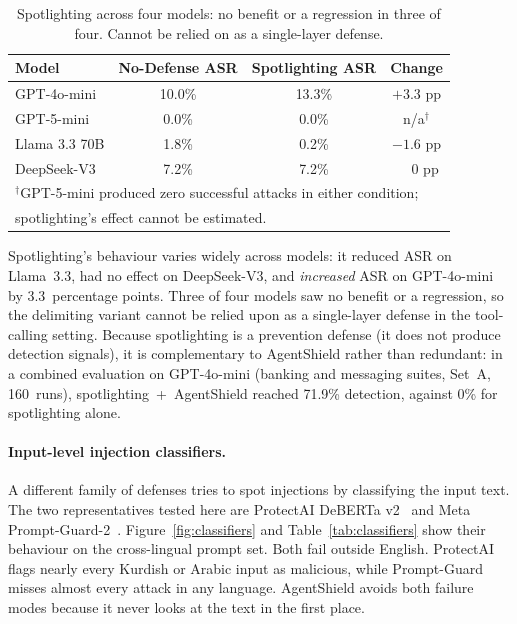 \documentclass[preprint,12pt]{elsarticle}
\begin{document}
\begin{table}[H]
\centering
\caption{Spotlighting across four models: no benefit or a regression in three of four. Cannot be relied on as a single-layer defense.}
\label{tab:spotlight}
\begin{tabular}{lccc}
\toprule
\textbf{Model} & \textbf{No-Defense ASR} & \textbf{Spotlighting ASR} & \textbf{Change} \\
\midrule
GPT-4o-mini   & 10.0\% & 13.3\% & $+3.3$ pp \\
GPT-5-mini    & 0.0\%  & 0.0\%  & n/a$^\dagger$ \\
Llama 3.3 70B & 1.8\%  & 0.2\%  & $-1.6$ pp \\
DeepSeek-V3   & 7.2\%  & 7.2\%  & $\phantom{+}0$ pp \\
\bottomrule
\multicolumn{4}{l}{\footnotesize $^\dagger$GPT-5-mini produced zero successful attacks in either condition;} \\
\multicolumn{4}{l}{\footnotesize spotlighting's effect cannot be estimated.} \\
\end{tabular}
\end{table}

Spotlighting's behaviour varies widely across models: it reduced ASR on Llama~3.3, had no effect on DeepSeek-V3, and \emph{increased} ASR on GPT-4o-mini by 3.3~percentage points. Three of four models saw no benefit or a regression, so the delimiting variant cannot be relied upon as a single-layer defense in the tool-calling setting. Because spotlighting is a prevention defense (it does not produce detection signals), it is complementary to AgentShield rather than redundant: in a combined evaluation on GPT-4o-mini (banking and messaging suites, Set~A, 160~runs), spotlighting~+~AgentShield reached 71.9\% detection, against 0\% for spotlighting alone.

\paragraph{Input-level injection classifiers.}
A different family of defenses tries to spot injections by classifying the input text. The two representatives tested here are ProtectAI DeBERTa v2~\citep{protectai2024deberta} and Meta Prompt-Guard-2~\citep{meta2024promptguard}. Figure~\ref{fig:classifiers} and Table~\ref{tab:classifiers} show their behaviour on the cross-lingual prompt set. Both fail outside English. ProtectAI flags nearly every Kurdish or Arabic input as malicious, while Prompt-Guard misses almost every attack in any language. AgentShield avoids both failure modes because it never looks at the text in the first place.
\end{document}
